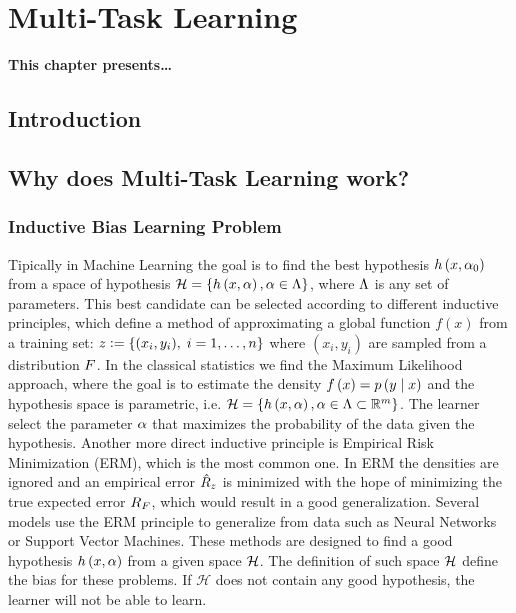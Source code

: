 
\chapter{Multi-Task Learning} %
\label{Chapter2}

{\bf \small{
This chapter presents\dots
}}

\section{Introduction}



\section{Why does Multi-Task Learning work?}
% 
\subsection{Inductive Bias Learning Problem} %
Tipically in Machine Learning the goal is to find the best hypothesis $h\left(x, \alpha_0\right)$ from a space of hypothesis $\mathcal{H} = \left\{h\left(x, \alpha\right), \alpha \in \Lambda\right\}$, where $\Lambda$ is any set of parameters. This best candidate can be selected according to different inductive principles, which define a method of approximating a global function $f(x)$ from a training set:
$ z \vcentcolon= \left\{(x_i, y_i),\; i=1, \ldots, n\right\} $
where $(x_i, y_i)$ are sampled from a distribution $F$.
%
In the classical statistics we find the Maximum Likelihood approach, where the goal is to estimate the density $f\left(x\right) = p\left( y \;\middle\vert\; x \right)$ and the hypothesis space is parametric, i.e. $\mathcal{H} = \left\{h\left(x, \alpha\right), \alpha \in \Lambda \subset \mathbb{R}^m\right\}$. The learner select the parameter $\alpha$ that maximizes the probability of the data given the hypothesis.
%
Another more direct inductive principle is Empirical Risk Minimization (ERM), which is the most common one. In ERM the densities are ignored and an empirical error $\hat{R}_z$ is minimized with the hope of minimizing the true expected error $R_F$, which would result in a good generalization. 
%
Several models use the ERM principle to generalize from data such as Neural Networks or Support Vector Machines. These methods are designed to find a good hypothesis $h\left(x, \alpha\right)$ from a given space $\mathcal{H}$. The definition of such space $\mathcal{H}$ define the bias for these problems. If $\mathcal{H}$ does not contain any good hypothesis, the learner will not be able to learn.
%

